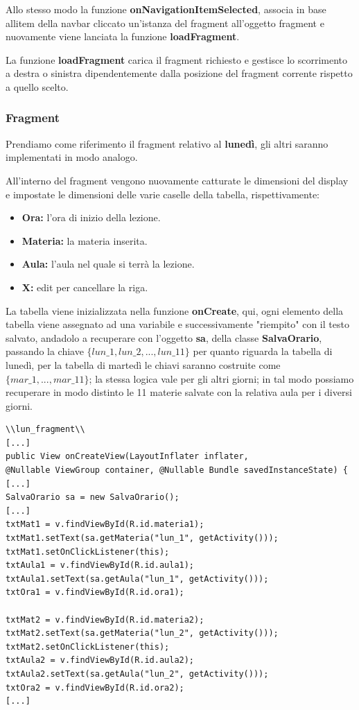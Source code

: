 \documentclass[a4paper, 50pt, twoside]{article}
\begin{document}
Allo stesso modo la funzione \textbf{onNavigationItemSelected}, associa in base allitem della navbar cliccato un'istanza del fragment all'oggetto fragment e nuovamente viene lanciata la funzione \textbf{loadFragment}.

La funzione \textbf{loadFragment} carica il fragment richiesto e gestisce lo scorrimento a destra o sinistra dipendentemente dalla posizione del fragment corrente rispetto a quello scelto.
\subsubsection{Fragment}
Prendiamo come riferimento il fragment relativo al \textbf{lunedì}, gli altri saranno implementati in modo analogo.

All'interno del fragment vengono nuovamente catturate le dimensioni del display e impostate le dimensioni delle varie caselle della tabella, rispettivamente:
\begin{itemize}
\item \textbf{Ora:} l'ora di inizio della lezione.
\item \textbf{Materia:} la materia inserita.
\item \textbf{Aula:} l'aula nel quale si terrà la lezione.
\item \textbf{X:} edit per cancellare la riga.
\end{itemize}

La tabella viene inizializzata nella funzione \textbf{onCreate}, qui, ogni elemento della tabella viene assegnato ad una variabile e successivamente "riempito" con il testo salvato, andadolo a recuperare con l'oggetto \textbf{sa}, della classe \textbf{SalvaOrario}, passando la chiave $\{lun\_1, lun\_2,..., lun\_11\}$ per quanto riguarda la tabella di lunedì, per la tabella di martedì le chiavi saranno costruite come $\{mar\_1,...,mar\_11\}$; la stessa logica vale per gli altri giorni; in tal modo possiamo recuperare in modo distinto le 11 materie salvate con la relativa aula per i diversi giorni.

\begin{lstlisting}
\\lun_fragment\\
[...]
public View onCreateView(LayoutInflater inflater, 
@Nullable ViewGroup container, @Nullable Bundle savedInstanceState) {
[...]
SalvaOrario sa = new SalvaOrario();
[...]
txtMat1 = v.findViewById(R.id.materia1);
txtMat1.setText(sa.getMateria("lun_1", getActivity()));
txtMat1.setOnClickListener(this);
txtAula1 = v.findViewById(R.id.aula1);
txtAula1.setText(sa.getAula("lun_1", getActivity()));
txtOra1 = v.findViewById(R.id.ora1);

txtMat2 = v.findViewById(R.id.materia2);
txtMat2.setText(sa.getMateria("lun_2", getActivity()));
txtMat2.setOnClickListener(this);
txtAula2 = v.findViewById(R.id.aula2);
txtAula2.setText(sa.getAula("lun_2", getActivity()));
txtOra2 = v.findViewById(R.id.ora2);
[...]
\end{lstlisting}
\end{document}
